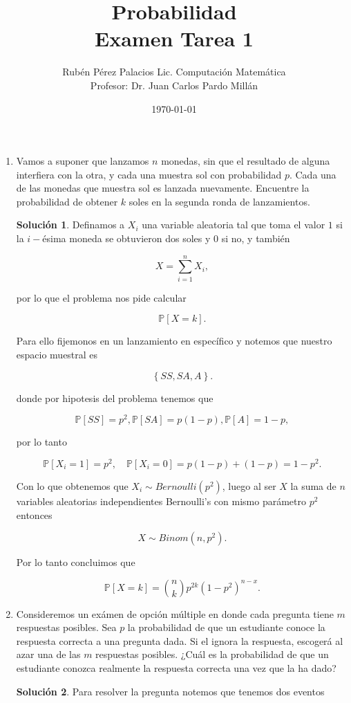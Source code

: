 \documentclass[letterpaper]{article}
\title{Probabilidad \\ Examen Tarea 1}
\author{Rubén Pérez Palacios Lic. Computación Matemática\\Profesor: Dr. Juan Carlos Pardo Millán}
\date{\today}
\theoremstyle{definition}
\theoremstyle{lemathm}
\theoremstyle{lemathm}
\newtheorem{sol}{Solución}
\theoremstyle{lemathm}
\theoremstyle{lemademthm}
\newcommand{\pars}[1]{\left( #1 \right) }
\newcommand{\bracs}[1]{\left[ #1 \right] }
\newcommand{\set}[1]{\left \{ #1 \right\} }
\newcommand{\PP}{\mathbb{P}}
\newcommand{\1}{\mathbbm{1}}
\begin{document}
	\maketitle

	\begin{enumerate}
		\item Vamos a suponer que lanzamos $n$ monedas, sin que el resultado de alguna interfiera con la otra, y cada una muestra sol con probabilidad $p$. Cada una de las monedas que muestra sol es lanzada nuevamente. Encuentre la probabilidad de obtener $k$ soles en la segunda ronda de lanzamientos.
		\begin{sol}
			Definamos a $X_i$ una variable aleatoria tal que toma el valor $1$ si la $i-$ésima moneda se obtuvieron dos soles y $0$ si no, y también 
			
			\[X = \sum_{i=1}^n X_i,\]

			por lo que el problema nos pide calcular

			\[\PP\bracs{X = k}.\]

			Para ello fijemonos en un lanzamiento en específico y notemos que nuestro espacio muestral es

			\[\set{SS, SA, A}.\]

			donde por hipotesis del problema tenemos que

			\[\PP\bracs{SS} = p^2, \PP\bracs{SA} = p(1-p), \PP\bracs{A} = 1-p,\]

			por lo tanto

			\[\PP\bracs{X_i=1} = p^2, \quad \PP\bracs{X_i=0}=p(1-p) + (1-p) = 1-p^2.\]

			Con lo que obtenemos que $X_i\sim Bernoulli(p^2)$, luego al ser $X$ la suma de $n$ variables aleatorias independientes Bernoulli's con mismo parámetro $p^2$ entonces
			
			\[X\sim Binom\pars{n,p^2}.\]

			Por lo tanto concluimos que

			\[\PP\bracs{X=k}=\binom{n}{k}p^{2k}(1-p^2)^{n-x}.\]


		\end{sol}
		\item Consideremos un exámen de opción múltiple en donde cada pregunta tiene $m$ respuestas posibles. Sea $p$ la probabilidad de que un estudiante conoce la respuesta correcta a una pregunta dada. Si el ignora la respuesta, escogerá al azar una de las $m$ respuestas posibles. ¿Cuál es la probabilidad de que un estudiante conozca realmente la respuesta correcta una vez que la ha dado?
		\begin{sol}
			Para resolver la pregunta notemos que tenemos dos eventos


\end{sol}
\end{enumerate}
\end{document}
